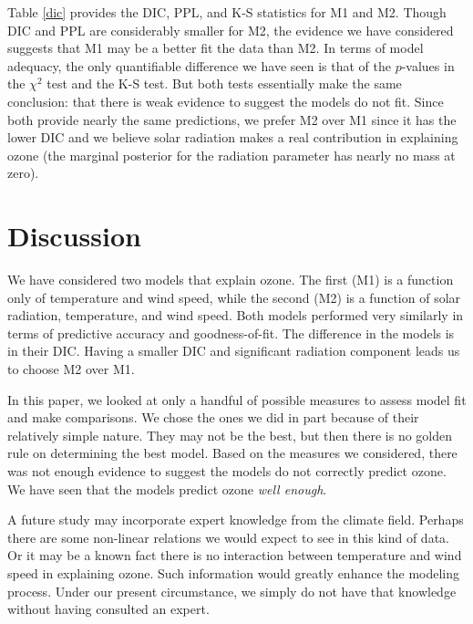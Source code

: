 \documentclass{asaproc}
\begin{document}
Table \ref{dic} provides the DIC, PPL, and K-S statistics for M1 and M2. Though DIC and PPL are considerably smaller for M2, the evidence we have considered suggests that M1 may be a better fit the data than M2. In terms of model adequacy, the only quantifiable difference we have seen is that of the $p$-values in the $\chi^2$ test and the K-S test. But both tests essentially make the same conclusion: that there is weak evidence to suggest the models do not fit. Since both provide nearly the same predictions, we prefer M2 over M1 since it has the lower DIC and we believe solar radiation makes a real contribution in explaining ozone (the marginal posterior for the radiation parameter has nearly no mass at zero).

\section{Discussion}

We have considered two models that explain ozone. The first (M1) is a function only of temperature and wind speed, while the second (M2) is a function of solar radiation, temperature, and wind speed. Both models performed very similarly in terms of predictive accuracy and goodness-of-fit. The difference in the models is in their DIC. Having a smaller DIC and significant radiation component leads us to choose M2 over M1.

In this paper, we looked at only a handful of possible measures to assess model fit and make comparisons. We chose the ones we did in part because of their relatively simple nature. They may not be the best, but then there is no golden rule on determining the best model. Based on the measures we considered, there was not enough evidence to suggest the models do not correctly predict ozone. We have seen that the models predict ozone \emph{well enough}.

A future study may incorporate expert knowledge from the climate field. Perhaps there are some non-linear relations we would expect to see in this kind of data. Or it may be a known fact there is no interaction between temperature and wind speed in explaining ozone. Such information would greatly enhance the modeling process. Under our present circumstance, we simply do not have that knowledge without having consulted an expert.
\end{document}
